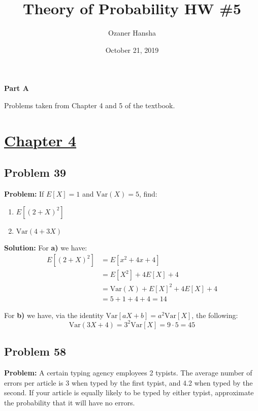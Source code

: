 \documentclass{article}
\newcommand*\var[0]{\text{Var}}
\begin{document}
\title{Theory of Probability HW \#5}
\author{Ozaner Hansha}
\date{October 21, 2019}
\maketitle

\begin{center}
    \Large{\textbf{Part A}}
\end{center}

Problems taken from Chapter 4 and 5 of the textbook.

\section*{\underline{Chapter 4}}

\subsection*{Problem 39}
\noindent\textbf{Problem:} If $E[X]=1$ and $\var(X)=5$, find:
\begin{enumerate}[label=\textbf{\alph*)}]
    \item $E[(2+X)^2]$
    \item $\var(4+3X)$
\end{enumerate}
\bigskip

\noindent\textbf{Solution:} For \textbf{a)} we have:
\begin{align*}
    E[(2+X)^2]&=E[x^2+4x+4]\tag{algebra}\\
    &=E[X^2]+4E[X]+4\tag{linearity of expectation}\\
    &=\var(X)+E[X]^2+4E[X]+4\tag{def. of variance}\\
    &=5+1+4+4=14
\end{align*}

For \textbf{b)} we have, via the identity $\var[aX+b]=a^2\var[X]$, the following:
\begin{equation*}
    \var(3X+4)=3^2\var[X]=9\cdot5=45
\end{equation*}

\subsection*{Problem 58}
\noindent\textbf{Problem:} A certain typing agency employees 2 typists. The average number of errors per article is 3 when typed by the first typist, and 4.2 when typed by the second. If your article is equally likely to be typed by either typist, approximate the probability that it will have no errors.
\bigskip
\end{document}
